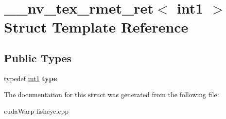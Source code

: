 \hypertarget{struct____nv__tex__rmet__ret_3_01int1_01_4}{}\section{\+\_\+\+\_\+nv\+\_\+tex\+\_\+rmet\+\_\+ret$<$ int1 $>$ Struct Template Reference}
\label{struct____nv__tex__rmet__ret_3_01int1_01_4}
\subsection*{Public Types}
\begin{DoxyCompactItemize}
\item 
typedef \hyperlink{structint1}{int1} {\bfseries type}\hypertarget{struct____nv__tex__rmet__ret_3_01int1_01_4_aca6cff83115cb2fdb965c1b0d036d8d8}{}\label{struct____nv__tex__rmet__ret_3_01int1_01_4_aca6cff83115cb2fdb965c1b0d036d8d8}

\end{DoxyCompactItemize}


The documentation for this struct was generated from the following file\+:\begin{DoxyCompactItemize}
\item 
cuda\+Warp-\/fisheye.\+cpp\end{DoxyCompactItemize}
